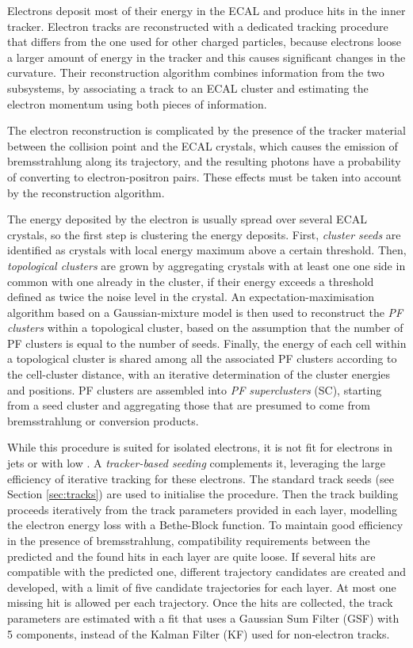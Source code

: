 Electrons deposit most of their energy in the ECAL and produce hits in the inner tracker.
Electron tracks are reconstructed with a dedicated tracking procedure that differs from the one used for other charged particles,
because electrons loose a larger amount of energy in the tracker and this causes significant changes in the curvature.
Their reconstruction algorithm combines information from the two subsystems,
by associating a track to an ECAL cluster and estimating the electron momentum using both pieces of information.

The electron reconstruction is complicated by the presence of the tracker material between the collision point and the ECAL crystals,
which causes the emission of bremsstrahlung along its trajectory, and the resulting photons have a probability of converting to electron-positron pairs.
These effects must be taken into account by the reconstruction algorithm.

The energy deposited by the electron is usually spread over several ECAL crystals, so the first step is clustering the energy deposits.
First, \textit{cluster seeds} are identified as crystals with local energy maximum above a certain threshold.
Then, \textit{topological clusters} are grown by aggregating crystals with at least one one side in common with one already in the cluster,
if their energy exceeds a threshold defined as twice the noise level in the crystal.
An expectation-maximisation algorithm based on a Gaussian-mixture model is then used to reconstruct the \textit{PF clusters} within a topological cluster,
based on the assumption that the number of PF clusters is equal to the number of seeds.
Finally, the energy of each cell within a topological cluster is shared among all the associated PF clusters according to the cell-cluster distance,
with an iterative determination of the cluster energies and positions.
PF clusters are assembled into \textit{PF superclusters} (SC), starting from a seed cluster and aggregating those that are presumed to come from bremsstrahlung or conversion products.

While this procedure is suited for isolated electrons, it is not fit for electrons in jets or with low \pt.
A \textit{tracker-based seeding} complements it, leveraging the large efficiency of iterative tracking for these electrons.
The standard track seeds (see Section \ref{sec:tracks}) are used to initialise the procedure.
Then the track building proceeds iteratively from the track parameters provided in each layer, modelling the electron energy loss with a Bethe-Block function.
To maintain good efficiency in the presence of bremsstrahlung, compatibility requirements between the predicted and the found hits in each layer are quite loose.
If several hits are compatible with the predicted one, different trajectory candidates are created and developed,
with a limit of five candidate trajectories for each layer.
At most one missing hit is allowed per each trajectory.
Once the hits are collected, the track parameters are estimated with a fit that uses a Gaussian Sum Filter (GSF) \cite{CMS-NOTE-2005-001} with 5 components,
instead of the Kalman Filter (KF) \cite{billoir.qian:simultaneous} used for non-electron tracks.

